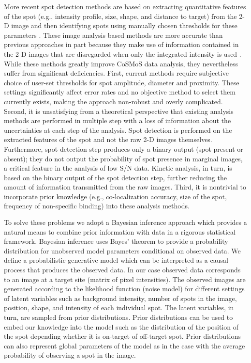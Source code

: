 More recent spot detection methods are based on extracting quantitative features of the spot (e.g., intensity profile, size, shape, and distance to target) from the 2-D image and then identifying spots using manually chosen thresholds for these parameters \citep{Friedman2015-nx, Smith2019-yb}. These image analysis based methods are more accurate than previous approaches in part because they make use of information contained in the 2-D images that are disregarded when only the integrated intensity is used \citep{Friedman2015-nx}. While these methods greatly improve CoSMoS data analysis, they nevertheless suffer from significant deficiencies. First, current methods require subjective choice of user-set thresholds for spot amplitude, diameter and proximity. These settings significantly affect error rates and no objective method to select them currently exists, making the approach non-robust and overly complicated. Second, it is unsatisfying from a theoretical perspective that existing analysis methods are performed in multiple step with a loss of information about the uncertainties at each step of the analysis. Spot detection is performed on the extracted features of the spot and not the raw 2-D images themselves. Furthermore, spot detection step produces only a binary output (spot present or absent); they do not output the probability of spot presence in marginal images, a critical feature in the analysis of low S/N data. Kinetic analysis, in turn, is based on the binary output of the spot detection step, further reducing the amount of information transmitted from the raw images. Third, it is nontrivial to incorporate prior knowledge (e.g., co-localization accuracy, size of the spot, frequency of non-specific binding) into these analysis methods.

To solve these problems we adopt a Bayesian inference approach which provides a natural means to combine prior information with data in a rigorous statistical framework. Bayesian inference uses Bayes' theorem to provide a probability distribution for unobserved model parameters conditional on observed data. We define a probabilistic generative model which can be interpreted as a causal process that produces the observed data. In our case observed data corresponds to an image at a target site (matrix of pixel intensities). The observed images are generated according to the likelihood function (noise model) for different settings of latent variables such as background intensity, number of spots in the image, position, shape, and intensity of each individual spot. The latent variables, in turn, are sampled from prior distributions. Prior distributions can be used to embed our knowledge into the model such as the distribution of the position of the spot depending whether it is on-target of off-target spot. Prior distributions can also represent global parameters of the model as in the case with the average probability of observing a spot in the image.

